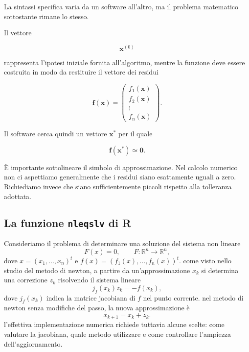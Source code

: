 La sintassi specifica varia da un software all'altro, ma il problema
matematico sottostante rimane lo stesso.

Il vettore

\begin{equation*}
    \mathbf{x}^{(0)}
\end{equation*}

rappresenta l'ipotesi iniziale fornita all'algoritmo, mentre la
funzione deve essere costruita in modo da restituire il vettore dei
residui

\begin{equation*}
    \mathbf{f}(\mathbf{x})
    =
    \begin{pmatrix}
        f_1(\mathbf{x})\\
        f_2(\mathbf{x})\\
        \vdots\\
        f_n(\mathbf{x})
    \end{pmatrix}.
\end{equation*}

Il software cerca quindi un vettore $\mathbf{x}^*$ per il quale

\begin{equation*}
    \mathbf{f}(\mathbf{x}^*)
    \simeq
    \mathbf{0}.
\end{equation*}

È importante sottolineare il simbolo di approssimazione. Nel calcolo
numerico non ci aspettiamo generalmente che i residui siano
esattamente uguali a zero. Richiediamo invece che siano
sufficientemente piccoli rispetto alla tolleranza adottata.

\subsection{La funzione \texttt{nleqslv} di R}
\label{subsec:nleqslv_derivate}

Consideriamo il problema di determinare una soluzione del sistema non lineare
\begin{equation}
 F(x)=0,\qquad F:\mathbb{R}^n\longrightarrow\mathbb{R}^n,
 \label{eq:nleqslv_sistema}
\end{equation}
dove $x=(x_1,\ldots,x_n)^t$ e $f(x)=(f_1(x),\ldots,f_n(x))^t$. come visto nello studio del metodo di newton, a partire da un'approssimazione $x_k$ si determina una correzione $z_k$ risolvendo il sistema lineare
\begin{equation*}
 j_f(x_k)z_k=-f(x_k),
 \label{eq:nleqslv_newton}
\end{equation*}
dove $j_f(x_k)$ indica la matrice jacobiana di $f$ nel punto corrente. nel metodo di newton senza modifiche del passo, la nuova approssimazione è 
\begin{equation}
x_{k+1}=x_k+z_k. 
	\label{eq:psasso1}
\end{equation}
l'effettiva implementazione numerica richiede tuttavia alcune scelte: come valutare la jacobiana, quale metodo utilizzare e come controllare l'ampiezza dell'aggiornamento.

